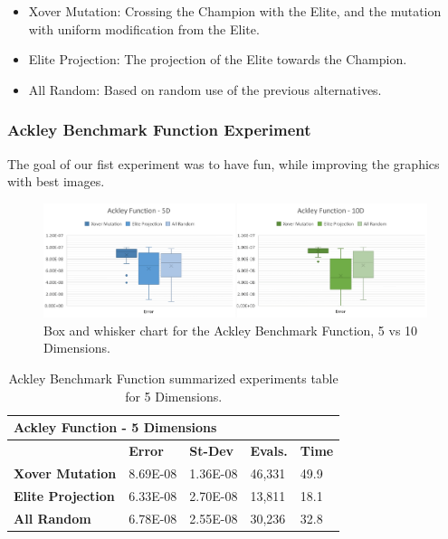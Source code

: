 \documentclass[graybox]{svmult}
\begin{document}
\begin{itemize}
    \item   Xover Mutation:      Crossing the Champion with the Elite, and the mutation with uniform modification from the Elite.
    \item   Elite Projection:    The projection of the Elite towards the Champion. 
    \item   All Random:          Based on random use of the previous alternatives.
\end{itemize}

\subsubsection{Ackley Benchmark Function Experiment}

    The goal of our fist experiment was to have fun, while improving the graphics with best images.

    \begin{figure}
        \includegraphics[width=\linewidth, frame]{img/fig_fun_ackley.pdf}
        \caption{Box and whisker chart for the Ackley Benchmark Function, 5 vs 10 Dimensions.} \label{fig.fun_ackley}
        \end{figure}

    \begin{table}[]
        \scriptsize
        \centering
        \caption{Ackley Benchmark Function summarized experiments table for 5 Dimensions.}\label{tab.fun_ackley5}
        \begin{tabular}{@{}lllll@{}}
        \toprule
        \multicolumn{5}{l}{\textbf{Ackley Function - 5 Dimensions}} \\ \midrule
        & \textbf{Error} & \textbf{St-Dev} & \textbf{Evals.} & \textbf{Time} \\
        \textbf{Xover Mutation} & 8.69E-08 & 1.36E-08 & 46,331 & 49.9 \\
        \textbf{Elite Projection} & 6.33E-08 & 2.70E-08 & 13,811 & 18.1 \\
        \textbf{All Random} & 6.78E-08 & 2.55E-08 & 30,236 & 32.8 \\ \bottomrule
        \end{tabular}
        \end{table}
\end{document}
